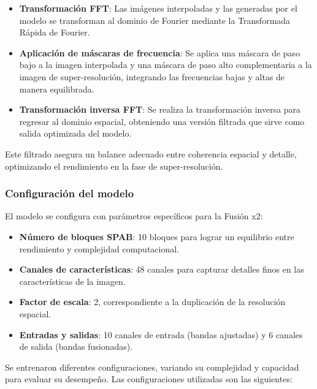             \begin{itemize}
                \item \textbf{Transformación FFT}: Las imágenes interpoladas y las generadas por el modelo se transforman al dominio de Fourier mediante la Transformada Rápida de Fourier.
                \item \textbf{Aplicación de máscaras de frecuencia}: Se aplica una máscara de paso bajo a la imagen interpolada y una máscara de paso alto complementaria a la imagen de super-resolución, integrando las frecuencias bajas y altas de manera equilibrada.
                \item \textbf{Transformación inversa FFT}: Se realiza la transformación inversa para regresar al dominio espacial, obteniendo una versión filtrada que sirve como salida optimizada del modelo.
            \end{itemize}

            Este filtrado asegura un balance adecuado entre coherencia espacial y detalle, optimizando el rendimiento en la fase de super-resolución.

        \subsubsection{Configuración del modelo}

            El modelo se configura con parámetros específicos para la Fusión x2:

            \begin{itemize}
                \item \textbf{Número de bloques SPAB}: 10 bloques para lograr un equilibrio entre rendimiento y complejidad computacional.
                \item \textbf{Canales de características}: 48 canales para capturar detalles finos en las características de la imagen.
                \item \textbf{Factor de escala}: 2, correspondiente a la duplicación de la resolución espacial.
                \item \textbf{Entradas y salidas}: 10 canales de entrada (bandas ajustadas) y 6 canales de salida (bandas fusionadas).
            \end{itemize}

            Se entrenaron diferentes configuraciones, variando su complejidad y capacidad para evaluar su desempeño. Las configuraciones utilizadas son las siguientes:

